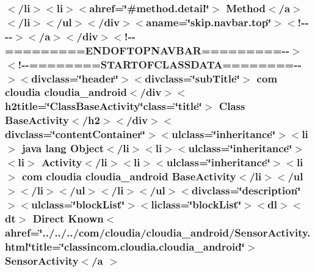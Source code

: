 \hypertarget{_base_activity_8html_af84baf17189aa6d79649fa91a35b8d7e}{
\subsubsection[{Sensor\-Activity$<$/a $>$}]{\setlength{\rightskip}{0pt plus 5cm}$<$/li$>$$<$li$>$$<$ahref=\char`\"{}\#method.\-detail\char`\"{}$>$ Method$<$/{\bf a}$>$$<$/li$>$$<$/ul$>$$<$/div$>$$<$aname=\char`\"{}skip.\-navbar.\-top\char`\"{}$>$$<$!-\/-\/-\/-\/$>$$<$/a$>$$<$/div$>$$<$!-\/-\/=========E\-N\-D\-O\-F\-T\-O\-P\-N\-A\-V\-B\-A\-R=========-\/-\/$>$$<$!-\/-\/========S\-T\-A\-R\-T\-O\-F\-C\-L\-A\-S\-S\-D\-A\-T\-A========-\/-\/$>$$<$divclass=\char`\"{}header\char`\"{}$>$$<$divclass=\char`\"{}sub\-Title\char`\"{}$>$ com cloudia cloudia\-\_\-android$<$/div$>$$<$h2title=\char`\"{}Class\-Base\-Activity\char`\"{}class=\char`\"{}title\char`\"{}$>$ Class {\bf Base\-Activity}$<$/h2$>$$<$/div$>$$<$divclass=\char`\"{}content\-Container\char`\"{}$>$$<$ulclass=\char`\"{}inheritance\char`\"{}$>$$<$li$>$ java lang Object$<$/li$>$$<$li$>$$<$ulclass=\char`\"{}inheritance\char`\"{}$>$$<$li$>$ Activity$<$/li$>$$<$li$>$$<$ulclass=\char`\"{}inheritance\char`\"{}$>$$<$li$>$ com cloudia cloudia\-\_\-android {\bf Base\-Activity}$<$/li$>$$<$/ul$>$$<$/li$>$$<$/ul$>$$<$/li$>$$<$/ul$>$$<$divclass=\char`\"{}description\char`\"{}$>$$<$ulclass=\char`\"{}block\-List\char`\"{}$>$$<$liclass=\char`\"{}block\-List\char`\"{}$>$$<$dl$>$$<${\bf dt}$>$ Direct Known$<$ahref=\char`\"{}../../../com/cloudia/cloudia\-\_\-android/Sensor\-Activity.\-html\char`\"{}title=\char`\"{}classincom.\-cloudia.\-cloudia\-\_\-android\char`\"{}$>$ Sensor\-Activity$<$/{\bf a} $>$}}\label{_base_activity_8html_af84baf17189aa6d79649fa91a35b8d7e}
